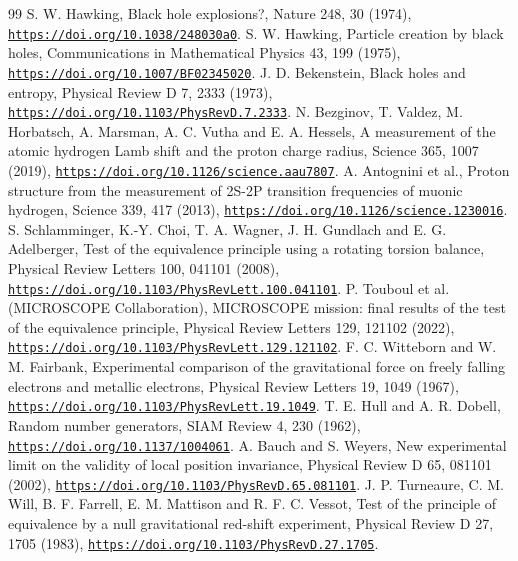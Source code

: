 \documentclass[pdflatex,sn-mathphys-num]{sn-jnl}
\theoremstyle{thmstyleone}
\begin{document}
\begin{thebibliography}{99}
 S. W. Hawking, Black hole explosions?, Nature 248, 30 (1974), \href{https://doi.org/10.1038/248030a0}{\nolinkurl{https://doi.org/10.1038/248030a0}}.
 S. W. Hawking, Particle creation by black holes, Communications in Mathematical Physics 43, 199 (1975), \href{https://doi.org/10.1007/BF02345020}{\nolinkurl{https://doi.org/10.1007/BF02345020}}.
 J. D. Bekenstein, Black holes and entropy, Physical Review D 7, 2333 (1973), \href{https://doi.org/10.1103/PhysRevD.7.2333}{\nolinkurl{https://doi.org/10.1103/PhysRevD.7.2333}}.
 N. Bezginov, T. Valdez, M. Horbatsch, A. Marsman, A. C. Vutha and E. A. Hessels, A measurement of the atomic hydrogen Lamb shift and the proton charge radius, Science 365, 1007 (2019), \href{https://doi.org/10.1126/science.aau7807}{\nolinkurl{https://doi.org/10.1126/science.aau7807}}.
 A. Antognini et al., Proton structure from the measurement of 2S-2P transition frequencies of muonic hydrogen, Science 339, 417 (2013), \href{https://doi.org/10.1126/science.1230016}{\nolinkurl{https://doi.org/10.1126/science.1230016}}.
 S. Schlamminger, K.-Y. Choi, T. A. Wagner, J. H. Gundlach and E. G. Adelberger, Test of the equivalence principle using a rotating torsion balance, Physical Review Letters 100, 041101 (2008), \href{https://doi.org/10.1103/PhysRevLett.100.041101}{\nolinkurl{https://doi.org/10.1103/PhysRevLett.100.041101}}.
 P. Touboul et al. (MICROSCOPE Collaboration), MICROSCOPE mission: final results of the test of the equivalence principle, Physical Review Letters 129, 121102 (2022), \href{https://doi.org/10.1103/PhysRevLett.129.121102}{\nolinkurl{https://doi.org/10.1103/PhysRevLett.129.121102}}.
 F. C. Witteborn and W. M. Fairbank, Experimental comparison of the gravitational force on freely falling electrons and metallic electrons, Physical Review Letters 19, 1049 (1967), \href{https://doi.org/10.1103/PhysRevLett.19.1049}{\nolinkurl{https://doi.org/10.1103/PhysRevLett.19.1049}}.
 T. E. Hull and A. R. Dobell, Random number generators, SIAM Review 4, 230 (1962), \href{https://doi.org/10.1137/1004061}{\nolinkurl{https://doi.org/10.1137/1004061}}.
 A. Bauch and S. Weyers, New experimental limit on the validity of local position invariance, Physical Review D 65, 081101 (2002), \href{https://doi.org/10.1103/PhysRevD.65.081101}{\nolinkurl{https://doi.org/10.1103/PhysRevD.65.081101}}.
 J. P. Turneaure, C. M. Will, B. F. Farrell, E. M. Mattison and R. F. C. Vessot, Test of the principle of equivalence by a null gravitational red-shift experiment, Physical Review D 27, 1705 (1983), \href{https://doi.org/10.1103/PhysRevD.27.1705}{\nolinkurl{https://doi.org/10.1103/PhysRevD.27.1705}}.

\end{thebibliography}
\end{document}
